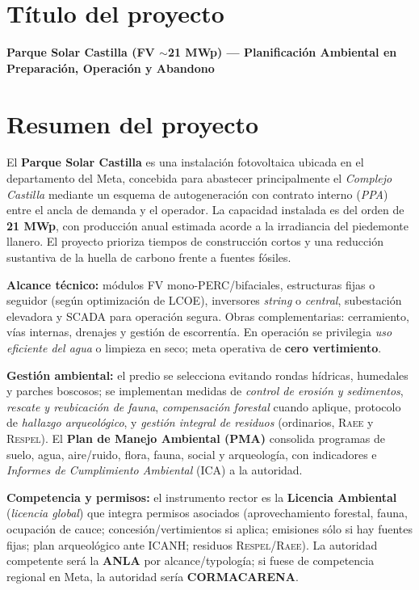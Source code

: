 \section{Título del proyecto}
\textbf{Parque Solar Castilla (FV $\sim$21 MWp) — Planificación Ambiental en Preparación, Operación y Abandono}

\section{Resumen del proyecto}

El \textbf{Parque Solar Castilla} es una instalación fotovoltaica ubicada en el departamento del Meta, concebida para abastecer principalmente el \textit{Complejo Castilla} mediante un esquema de autogeneración con contrato interno (\emph{PPA}) entre el ancla de demanda y el operador. La capacidad instalada es del orden de \textbf{21 MWp}, con producción anual estimada acorde a la irradiancia del piedemonte llanero. El proyecto prioriza tiempos de construcción cortos y una reducción sustantiva de la huella de carbono frente a fuentes fósiles.

\medskip

\textbf{Alcance técnico:} módulos FV mono-PERC/bifaciales, estructuras fijas o seguidor (según optimización de LCOE), inversores \emph{string} o \emph{central}, subestación elevadora y SCADA para operación segura. Obras complementarias: cerramiento, vías internas, drenajes y gestión de escorrentía. En operación se privilegia \textit{uso eficiente del agua} o limpieza en seco; meta operativa de \textbf{cero vertimiento}.

\medskip

\textbf{Gestión ambiental:} el predio se selecciona evitando rondas hídricas, humedales y parches boscosos; se implementan medidas de \emph{control de erosión y sedimentos}, \emph{rescate y reubicación de fauna}, \emph{compensación forestal} cuando aplique, protocolo de \emph{hallazgo arqueológico}, y \emph{gestión integral de residuos} (ordinarios, \textsc{Raee} y \textsc{Respel}). El \textbf{Plan de Manejo Ambiental (PMA)} consolida programas de suelo, agua, aire/ruido, flora, fauna, social y arqueología, con indicadores e \textit{Informes de Cumplimiento Ambiental} (ICA) a la autoridad.

\medskip

\textbf{Competencia y permisos:} el instrumento rector es la \textbf{Licencia Ambiental} (\emph{licencia global}) que integra permisos asociados (aprovechamiento forestal, fauna, ocupación de cauce; concesión/vertimientos si aplica; emisiones sólo si hay fuentes fijas; plan arqueológico ante ICANH; residuos \textsc{Respel}/\textsc{Raee}). La autoridad competente será la \textbf{ANLA} por alcance/typología; si fuese de competencia regional en Meta, la autoridad sería \textbf{CORMACARENA}.

